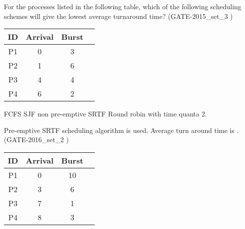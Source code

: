 \begin{questyle}

  \question  For the processes listed in the following table, which of the following scheduling schemes
            will give the lowest average turnaround time? (GATE-2015\_set\_3 )

    \begin{myTableStyle}
    \begin{center}
    \begin{tabular}{ |c|c|c|c| } \hline
          ID & Arrival &  Burst     \\ \hline
          P1 & 0 & 3     \\ \hline
          P2 & 1 & 6     \\ \hline
          P3 & 4 & 4     \\ \hline
          P4 & 6 & 2      \\ \hline
    \end{tabular}
    \end{center}
  \end{myTableStyle}
  \vspace{0.08in}

  \begin{choices}
    \choice FCFS
    \choice SJF non pre-emptive
    \CorrectChoice SRTF
    \choice Round robin with time quanta 2.
  \end{choices}

  \end{questyle}





\begin{questyle}

  \question Pre-emptive SRTF scheduling algorithm is used. Average turn around time is \fillin[8.25]. (GATE-2016\_set\_2 )

    \begin{myTableStyle}
    \begin{center}
    \begin{tabular}{ |c|c|c|c| } \hline
          ID & Arrival &  Burst     \\ \hline
          P1 & 0 & 10     \\ \hline
          P2 & 3 & 6     \\ \hline
          P3 & 7 & 1     \\ \hline
          P4 & 8 & 3      \\ \hline
    \end{tabular}
    \end{center}
  \end{myTableStyle}

  \end{questyle}

